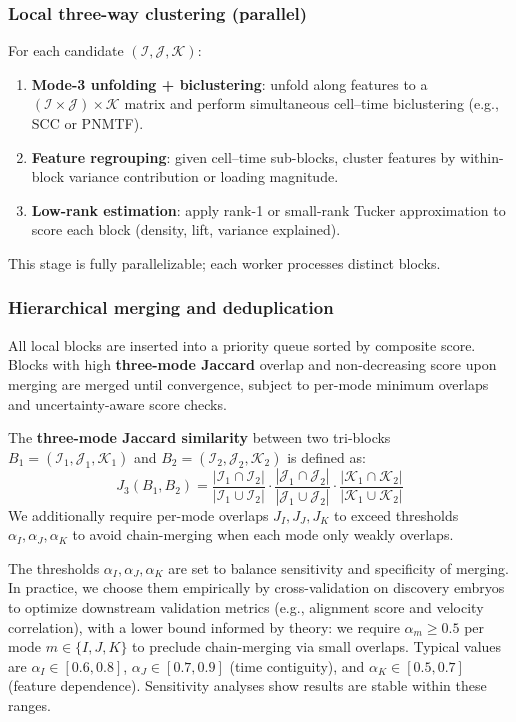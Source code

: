 \documentclass[unnumsec,webpdf,modern,large,namedate]{oup-authoring-template}%
\theoremstyle{thmstyleone}\newtheorem{theorem}{Theorem}
\theoremstyle{thmstyletwo}\newtheorem{example}{Example}
\theoremstyle{thmstylethree}\newtheorem{definition}{Definition}
\begin{document}
\subsubsection{Local three-way clustering (parallel)}
For each candidate $(\mathcal{I},\mathcal{J},\mathcal{K})$:
\begin{enumerate}
    \item \textbf{Mode-3 unfolding + biclustering}: unfold along features to a $(\mathcal{I} \times \mathcal{J}) \times \mathcal{K}$ matrix and perform simultaneous cell--time biclustering (e.g., SCC or PNMTF).
    \item \textbf{Feature regrouping}: given cell--time sub-blocks, cluster features by within-block variance contribution or loading magnitude.
    \item \textbf{Low-rank estimation}: apply rank-1 or small-rank Tucker approximation to score each block (density, lift, variance explained).
\end{enumerate}
This stage is fully parallelizable; each worker processes distinct blocks.

\subsubsection{Hierarchical merging and deduplication}
All local blocks are inserted into a priority queue sorted by composite score. Blocks with high \textbf{three-mode Jaccard} overlap and non-decreasing score upon merging are merged until convergence, subject to per-mode minimum overlaps and uncertainty-aware score checks.

The \textbf{three-mode Jaccard similarity} between two tri-blocks $B_1 = (\mathcal{I}_1, \mathcal{J}_1, \mathcal{K}_1)$ and $B_2 = (\mathcal{I}_2, \mathcal{J}_2, \mathcal{K}_2)$ is defined as:
\begin{equation}
J_3(B_1,B_2) = \frac{|\mathcal{I}_1\cap \mathcal{I}_2|}{|\mathcal{I}_1\cup \mathcal{I}_2|} \cdot \frac{|\mathcal{J}_1\cap \mathcal{J}_2|}{|\mathcal{J}_1\cup \mathcal{J}_2|} \cdot \frac{|\mathcal{K}_1\cap \mathcal{K}_2|}{|\mathcal{K}_1\cup \mathcal{K}_2|}
\label{eq:trimode_jaccard}
\end{equation}
We additionally require per-mode overlaps $J_I,J_J,J_K$ to exceed thresholds $\alpha_I,\alpha_J,\alpha_K$ to avoid chain-merging when each mode only weakly overlaps.

The thresholds $\alpha_I,\alpha_J,\alpha_K$ are set to balance sensitivity and specificity of merging. In practice, we choose them empirically by cross-validation on discovery embryos to optimize downstream validation metrics (e.g., alignment score and velocity correlation), with a lower bound informed by theory: we require $\alpha_m\geq 0.5$ per mode $m\in\{I,J,K\}$ to preclude chain-merging via small overlaps. Typical values are $\alpha_I\in[0.6,0.8]$, $\alpha_J\in[0.7,0.9]$ (time contiguity), and $\alpha_K\in[0.5,0.7]$ (feature dependence). Sensitivity analyses show results are stable within these ranges.
\end{document}
